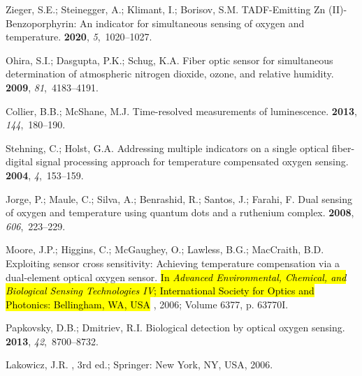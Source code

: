 \documentclass[sensors,article,accept,moreauthors,pdftex,10pt,a4paper]{Definitions/mdpi}
\begin{document}
\begin{thebibliography}{999}
Zieger, S.E.; Steinegger, A.; Klimant, I.; Borisov, S.M.
\newblock TADF-Emitting Zn (II)-Benzoporphyrin: An indicator for simultaneous
  sensing of oxygen and temperature.
 {\bf 2020}, {\em 5},~1020--1027.

Ohira, S.I.; Dasgupta, P.K.; Schug, K.A.
\newblock Fiber optic sensor for simultaneous determination of atmospheric
  nitrogen dioxide, ozone, and relative humidity.
 {\bf 2009}, {\em 81},~4183--4191.

Collier, B.B.; McShane, M.J.
\newblock Time-resolved measurements of luminescence.
 {\bf 2013}, {\em 144},~180--190.

Stehning, C.; Holst, G.A.
\newblock Addressing multiple indicators on a single optical fiber-digital
  signal processing approach for temperature compensated oxygen sensing.
 {\bf 2004}, {\em 4},~153--159.

Jorge, P.; Maule, C.; Silva, A.; Benrashid, R.; Santos, J.; Farahi, F.
\newblock Dual sensing of oxygen and temperature using quantum dots and a
  ruthenium complex.
 {\bf 2008}, {\em 606},~223--229.

Moore, J.P.; Higgins, C.; McGaughey, O.; Lawless, B.G.; MacCraith, B.D.
\newblock Exploiting sensor cross sensitivity: Achieving temperature
  compensation via a dual-element optical oxygen sensor.
\newblock  \hl{In \emph{Advanced Environmental, Chemical, and Biological Sensing
  Technologies IV}; International Society for Optics and Photonics: Bellingham, WA, USA} %
,  2006; Volume
  6377, p. 63770I.

Papkovsky, D.B.; Dmitriev, R.I.
\newblock Biological detection by optical oxygen sensing.~ {\bf 2013}, {\em 42},~8700--8732.

Lakowicz, J.R.
, 3rd ed.; Springer: New
  York, NY, USA,  2006.


\end{thebibliography}
\end{document}

